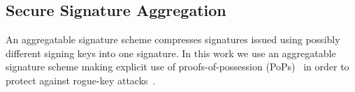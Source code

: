 \subsection{Secure Signature Aggregation}
\label{sec:def_aggregate}
An aggregatable signature scheme compresses signatures issued using
possibly different signing keys into one signature. In this work we use
an aggregatable signature scheme making explicit use of proofs-of-possession 
(PoPs)~\cite{proofs_of_posession} in order to protect against rogue-key attacks~\cite{proofs_of_posession}. 

